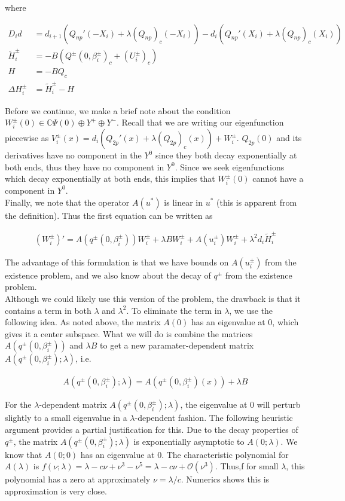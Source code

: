 \documentclass[12pt]{article}
\def\C{{\mathbb C}}
\begin{document}
where

\begin{align*}
D_i d &= d_{i+1}(Q_{np}'(-X_i) + \lambda (Q_{np})_c(-X_i))
- d_i ( Q_{np}'(X_i) + \lambda (Q_{np})_c(X_i) ) \\
\tilde{H}_i^\pm &= -B( Q^\pm(0, \beta_i^\pm)_c + (U_i^\pm)_c)  \\
H &= -B Q_c \\
\Delta H_i^\pm &= \tilde{H}_i^\pm - H
\end{align*}

Before we continue, we make a brief note about the condition $W_i^\pm(0) \in \C \Psi(0) \oplus Y^+ \oplus Y^-$. Recall that we are writing our eigenfunction piecewise as $V_i^\pm(x) = d_i(Q_{2p}'(x) + \lambda (Q_{2p})_c(x)) + W_i^\pm $. $Q_{2p}(0)$ and its derivatives have no component in the $Y^0$ since they both decay exponentially at both ends, thus they have no component in $Y^0$. Since we seek eigenfunctions which decay exponentially at both ends, this implies that $W_i^\pm(0)$ cannot have a component in $Y^0$.\\

Finally, we note that the operator $A(u^*)$ is linear in $u^*$ (this is apparent from the definition). Thus the first equation can be written as 

\begin{align*}
(W_i^\pm)' = A(q^\pm(0, \beta_i^\pm)) W_i^\pm + \lambda B W_i^\pm + A(u_i^\pm) W_i^\pm + \lambda^2 d_i \tilde{H}_i^\pm
\end{align*}

The advantage of this formulation is that we have bounds on $A(u_i^\pm)$ from the existence problem, and we also know about the decay of $q^\pm$ from the existence problem.\\

Although we could likely use this version of the problem, the drawback is that it contains a term in both $\lambda$ and $\lambda^2$. To eliminate the term in $\lambda$, we use the following idea. As noted above, the matrix $A(0)$ has an eigenvalue at 0, which gives it a center subspace. What we will do is combine the matrices $A(q^\pm(0, \beta_i^\pm))$ and $\lambda B$ to get a new paramater-dependent matrix $A(q^\pm(0, \beta_i^\pm); \lambda)$, i.e. 

\begin{align}
A(q^\pm(0, \beta_i^\pm); \lambda) = A(q^\pm(0, \beta_i^\pm)(x)) + \lambda B
\end{align}

For the $\lambda$-dependent matrix $A(q^\pm(0, \beta_i^\pm); \lambda)$, the eigenvalue at 0 will perturb slightly to a small eigenvalue in a $\lambda$-dependent fashion. The following heuristic argument provides a partial justification for this. Due to the decay properties of $q^\pm$, the matrix $A(q^\pm(0, \beta_i^\pm); \lambda)$ is exponentially asymptotic to $A(0; \lambda)$. We know that $A(0; 0)$ has an eigenvalue at 0. The characteristic polynomial for $A(\lambda)$ is $f(\nu; \lambda) = \lambda - c \nu + \nu^3 - \nu^5 = \lambda - c \nu + \mathcal{O}(\nu^3)$. Thus,f for small $\lambda$, this polynomial has a zero at approximately $\nu = \lambda / c$. Numerics shows this is approximation is very close.\\
\end{document}
